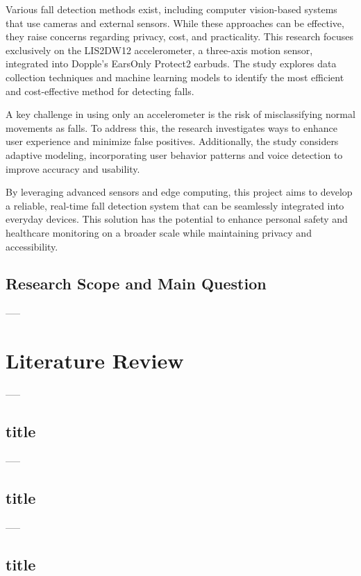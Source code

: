 \documentclass[conference]{IEEEtran}
\begin{document}
Various fall detection methods exist, including computer vision-based systems that use cameras and external sensors. While these approaches can be effective, they raise concerns regarding privacy, cost, and practicality. This research focuses exclusively on the LIS2DW12 accelerometer, a three-axis motion sensor, integrated into Dopple’s EarsOnly Protect2 earbuds. The study explores data collection techniques and machine learning models to identify the most efficient and cost-effective method for detecting falls.

A key challenge in using only an accelerometer is the risk of misclassifying normal movements as falls. To address this, the research investigates ways to enhance user experience and minimize false positives. Additionally, the study considers adaptive modeling, incorporating user behavior patterns and voice detection to improve accuracy and usability.

By leveraging advanced sensors and edge computing, this project aims to develop a reliable, real-time fall detection system that can be seamlessly integrated into everyday devices. This solution has the potential to enhance personal safety and healthcare monitoring on a broader scale while maintaining privacy and accessibility.
\subsection{Research Scope and Main Question}

-----

\section{Literature Review}

-----

\subsection{title}

-----

\subsection{title}

-----

\subsection{title}
\end{document}
